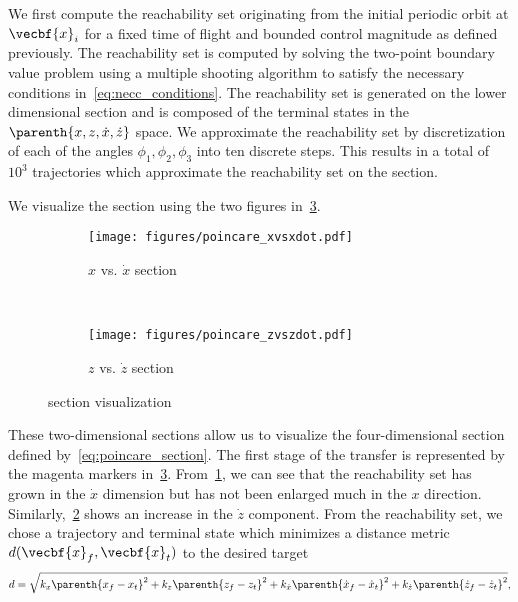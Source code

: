 We first compute the reachability set originating from the initial periodic orbit at \( \vecbf{x}_i\) for a fixed time of flight and bounded control magnitude as defined previously.
The reachability set is computed by solving the two-point boundary value problem using a multiple shooting algorithm to satisfy the necessary conditions in~\cref{eq:necc_conditions}.
The reachability set is generated on the lower dimensional \Poincare section and is composed of the terminal states in the \( \parenth{x,z,\dot{x},\dot{z} } \) space.
We approximate the reachability set by discretization of each of the angles \( \phi_1, \phi_2 , \phi_3 \) into ten discrete steps. 
This results in a total of \(10^3\) trajectories which approximate the reachability set on the \Poincare section.

We visualize the section using the two figures in~\cref{fig:poincare_section}.
\begin{figure}[htbp]
    \centering 
    \begin{subfigure}[htbp]{0.45\textwidth} 
        \texttt{[image: figures/poincare\_xvsxdot.pdf]} 
        \caption{\( x \) vs. \( \dot{x} \) \Poincare section} \label{fig:poincare_xvsxdot} 
    \end{subfigure}~
    \begin{subfigure}[htbp]{0.45\textwidth} 
        \texttt{[image: figures/poincare\_zvszdot.pdf]} 
        \caption{\( z \) vs. \( \dot{z} \) \Poincare section} \label{fig:poincare_zvszdot} 
    \end{subfigure}
    \caption{\Poincare section visualization \label{fig:poincare_section}}
\end{figure}
These two-dimensional sections allow us to visualize the four-dimensional \Poincare section defined by~\cref{eq:poincare_section}.
The first stage of the transfer is represented by the magenta markers in~\cref{fig:poincare_section}.
From~\cref{fig:poincare_xvsxdot}, we can see that the reachability set has grown in the \( \dot{x} \) dimension but has not been enlarged much in the \( x \) direction.
Similarly,~\cref{fig:poincare_zvszdot} shows an increase in the \( \dot{z} \) component.
From the reachability set, we chose a trajectory and terminal state which minimizes a distance metric \( d(\vecbf{x}_f,\vecbf{x}_t) \) to the desired target
\begin{align}\label{eq:reach_dist}
    d = \sqrt{k_x \parenth{x_f - x_t }^2 + k_z \parenth{z_f - z_t }^2 + k_{\dot{x}}\parenth{\dot{x}_f - \dot{x}_t }^2 + k_{\dot{z}}\parenth{\dot{z}_f - \dot{z}_t }^2} ,
\end{align}
